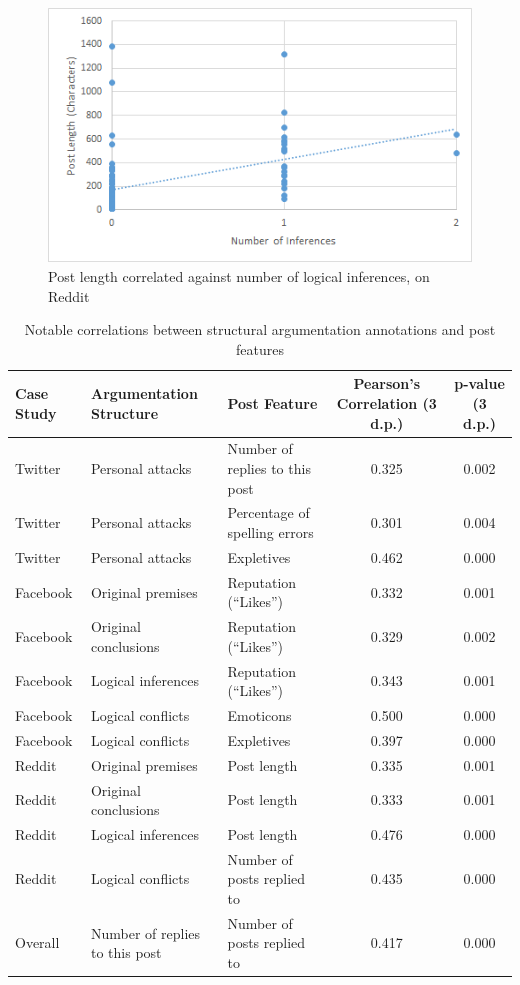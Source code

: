 \begin{figure}
\centering
\includegraphics[scale=0.5]{./figures/correlations/reddit.png}
\caption{Post length correlated against number of logical inferences, on Reddit}
\label{figure:correlations:reddit}
\end{figure}



\begin{table}
\centering
\caption{Notable correlations between structural argumentation annotations and post features}
\label{table:correlations}
\begin{tabular}{| l | l | l | c | c |}
\hline
\textbf{Case Study} & \textbf{Argumentation Structure} & \textbf{Post Feature} & \textbf{Pearson's Correlation (3 d.p.)} & \textbf{p-value (3 d.p.)}\\
\hline
Twitter & Personal attacks & Number of replies to this post & 0.325 & 0.002\\
\hline
Twitter & Personal attacks & Percentage of spelling errors & 0.301 & 0.004\\
\hline
Twitter & Personal attacks & Expletives & 0.462 & 0.000\\
\hline
Facebook & Original premises & Reputation (``Likes'') & 0.332 & 0.001\\
\hline
Facebook & Original conclusions & Reputation (``Likes'') & 0.329 & 0.002\\
\hline
Facebook & Logical inferences & Reputation (``Likes'') & 0.343 & 0.001\\
\hline
Facebook & Logical conflicts & Emoticons & 0.500 & 0.000\\
\hline
Facebook & Logical conflicts & Expletives & 0.397 & 0.000\\
\hline
Reddit & Original premises & Post length & 0.335 & 0.001\\
\hline
Reddit & Original conclusions & Post length & 0.333 & 0.001\\
\hline
Reddit & Logical inferences & Post length & 0.476 & 0.000\\
\hline
Reddit & Logical conflicts & Number of posts replied to & 0.435 & 0.000\\
\hline
Overall & Number of replies to this post & Number of posts replied to & 0.417 & 0.000\\
\hline
\end{tabular}
\end{table}
